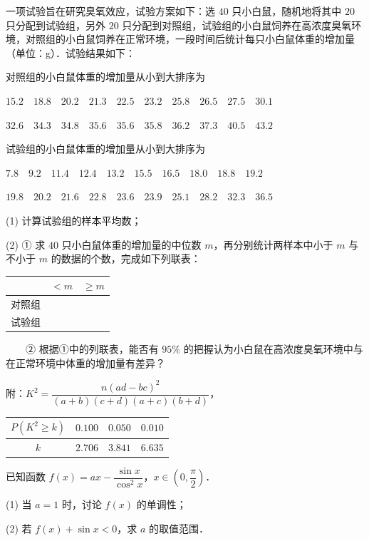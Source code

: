 \begin{question}
一项试验旨在研究臭氧效应，试验方案如下：选 $40$ 只小白鼠，随机地将其中 $20$ 只分配到试验组，另外 $20$ 只分配到对照组，试验组的小白鼠饲养在高浓度臭氧环境，对照组的小白鼠饲养在正常环境，一段时间后统计每只小白鼠体重的增加量（单位：g）．试验结果如下：

对照组的小白鼠体重的增加量从小到大排序为

$15.2\quad18.8\quad20.2\quad21.3\quad22.5\quad23.2\quad25.8\quad26.5\quad27.5\quad30.1$

$32.6\quad34.3\quad34.8\quad35.6\quad35.6\quad35.8\quad36.2\quad37.3\quad40.5\quad43.2$

试验组的小白鼠体重的增加量从小到大排序为

$7.8\quad9.2\quad11.4\quad12.4\quad13.2\quad15.5\quad16.5\quad18.0\quad18.8\quad19.2$

$19.8\quad20.2\quad21.6\quad22.8\quad23.6\quad23.9\quad25.1\quad28.2\quad32.3\quad36.5$

  (1) 计算试验组的样本平均数；

  (2) ① 求 $40$ 只小白鼠体重的增加量的中位数 $m$，再分别统计两样本中小于 $m$ 与不小于 $m$ 的数据的个数，完成如下列联表：

\begin{center}
\begin{tabular}{ccc}
\toprule
 & $<m$ & $\geqslant m$ \\
\midrule
对照组 &  &  \\
试验组 &  &  \\
\bottomrule
\end{tabular}
\end{center}

　　② 根据①中的列联表，能否有 $95\%$ 的把握认为小白鼠在高浓度臭氧环境中与在正常环境中体重的增加量有差异？

附：$K^2=\dfrac{n(ad-bc)^2}{(a+b)(c+d)(a+c)(b+d)}$，

\begin{center}
\begin{tabular}{cccc}
\toprule
$P(K^2\geqslant k)$ & $0.100$ & $0.050$ & $0.010$ \\
\midrule
$k$ & $2.706$ & $3.841$ & $6.635$ \\
\bottomrule
\end{tabular}
\end{center}

\end{question}
\begin{question}
已知函数 $f(x)=ax-\dfrac{\sin x}{\cos^2x}$，$x\in\left(0,\dfrac\pi2\right)$．

  (1) 当 $a=1$ 时，讨论 $f(x)$ 的单调性；

  (2) 若 $f(x)+\sin x<0$，求 $a$ 的取值范围．

\end{question}
